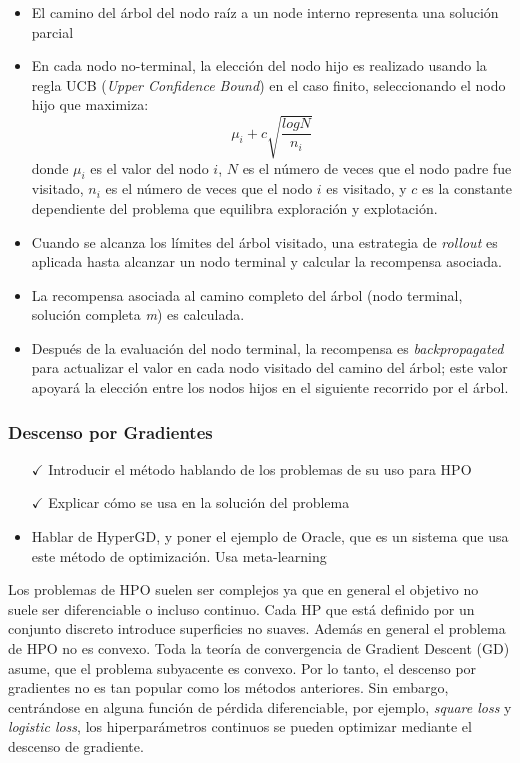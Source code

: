 \begin{itemize}
	\item El camino del árbol del nodo raíz a un node interno representa una solución parcial
	\item  En cada nodo no-terminal, la elección del nodo hijo es realizado usando la regla UCB (\textit{Upper Confidence Bound}) en el caso finito, seleccionando el nodo hijo que maximiza: 
	$$
	 \mu_i + c\sqrt{\frac{logN}{n_i}}
	$$
	donde $\mu_i$  es el valor del nodo $i$, $N$ es el número de veces que el nodo padre fue visitado, $n_i$ es el número de veces que el nodo $i$ es visitado, y $c$ es la constante dependiente del problema que equilibra exploración y explotación.
	\item Cuando se alcanza los límites del árbol visitado, una estrategia de \textit{rollout} es aplicada hasta alcanzar un nodo terminal y calcular la recompensa asociada.
	\item La recompensa asociada al camino completo del árbol (nodo terminal, solución completa \textit{m}) es calculada.
	\item Después de la evaluación del nodo terminal, la recompensa es \textit{backpropagated} para actualizar el valor en cada nodo visitado del camino del árbol; este valor apoyará la elección entre los nodos hijos en el siguiente recorrido por el árbol.
\end{itemize}

\subsubsection{Descenso por Gradientes}

\begin{itemize}
	\item[$\checkmark$] Introducir el método hablando de los problemas de su uso para HPO
	\item[$\checkmark$] Explicar cómo se usa en la solución del problema
	\item Hablar de HyperGD, y poner el ejemplo de Oracle, que es un sistema que usa este método de optimización. Usa meta-learning
\end{itemize}

Los problemas de HPO suelen ser complejos ya que en general el objetivo no suele ser diferenciable o incluso continuo. Cada HP que está definido por un conjunto discreto introduce superficies no suaves. Además en general el problema de HPO no es convexo. Toda la teoría de convergencia de Gradient Descent  (GD) asume, que el problema subyacente es convexo. Por lo tanto, el descenso por gradientes no es tan popular como los métodos anteriores. Sin embargo, centrándose en alguna función de pérdida diferenciable, por ejemplo, \textit{square loss} y \textit{logistic loss}, los hiperparámetros continuos se pueden optimizar mediante el descenso de gradiente.

